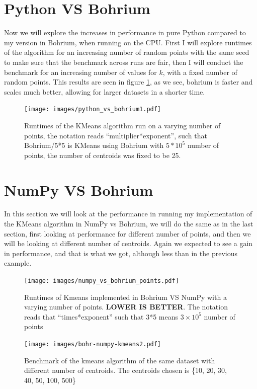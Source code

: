 \documentclass[12pt]{report}
\begin{document}
\section{Python VS Bohrium}
\label{sec:pyvbohrium}
Now we will explore the increases in performance in pure Python compared to my version in Bohrium, when running on the CPU. First I will explore runtimes of the algorithm for an increasing number of random points with the same seed to make sure that the benchmark across runs are fair, then I will conduct the benchmark for an increasing number of values for $k$, with a fixed number of random points. This results are seen in figure \ref{fig:pythonvsbohrium}, as we see, bohrium is faster and scales much better, allowing for larger datasets in a shorter time.

\begin{figure}[H]
  \centering
  \texttt{[image: images/python\_vs\_bohrium1.pdf]}
  \caption{\label{fig:pythonvsbohrium}Runtimes of the KMeans algorithm run on a varying number of points, the notation reads ``multiplier*exponent'', such that Bohrium/5*5 is KMeans using Bohrium with $5*10^5$ number of points, the number of centroids was fixed to be 25.}
\end{figure}

\section{NumPy VS Bohrium}
\label{sec:numpyvsbohrium}
In this section we will look at the performance in  running my implementation of the KMeans algorithm in  NumPy vs Bohrium, we will do the same as in the last section, first looking at performance for different number of points, and then we will be looking at different number of centroids. Again we expected to see a gain in performance, and that is what we got, although less than in the previous example.

\begin{figure}[H]
  \centering
  \texttt{[image: images/numpy\_vs\_bohrium\_points.pdf]}
  \caption{\label{fig:label}Runtimes of Kmeans implemented in Bohrium VS NumPy with a varying number of points. \textbf{LOWER IS BETTER}. The notation reads that ``times*exponent'' such that 3*5 means $3 \times 10^5$ number of points}
\end{figure}


\begin{figure}[H]
  \centering
  \texttt{[image: images/bohr-numpy-kmeans2.pdf]}
  \caption{\label{fig:bohriumvsnumpy}Benchmark of the kmeans algorithm of the same dataset with different number of centroids. The centroids chosen is \{10, 20, 30, 40, 50, 100, 500\}}
\end{figure}
\end{document}
